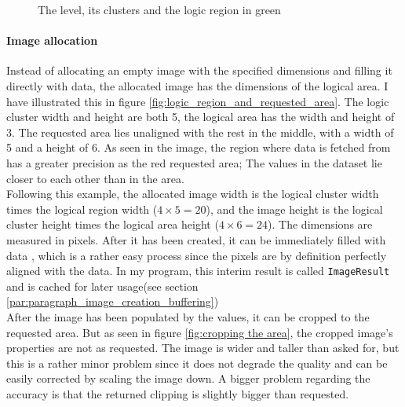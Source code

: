 \documentclass[10pt,a4paper,titlepage]{article}
\begin{document}
	\begin{figure}
		\centering
		\caption{The level, its clusters and the logic region in green}
		\label{fig:logic_region_over_dataset}
	\end{figure}
	\paragraph{Image allocation}
	Instead of allocating an empty image with the specified dimensions and filling it directly with data, the allocated image has the dimensions of the logical area. I have illustrated this in figure \ref{fig:logic_region_and_requested_area}. The logic cluster width and height are both 5, the logical area has the width and height of 3. The requested area lies unaligned with the rest in the middle, with a width of 5 and a height of 6. As seen in the image, the region where data is fetched from has a greater precision as the red requested area; The values in the dataset lie closer to each other than in the area.\\
	Following this example, the allocated image width is the logical cluster width times the logical region width (\(4 \times 5 = 20\)), and the image height is the logical cluster height times the logical area height (\(4 \times 6 = 24\)). The dimensions are measured in pixels. After it has been created, it can be immediately filled with data , which is a rather easy process since the pixels are by definition perfectly aligned with the data. In my program, this interim result is called \verb|ImageResult| and is cached for later usage(see section \ref{par:paragraph_image_creation_buffering}) \\
	After the image has been populated by the values, it can be cropped to the requested area. But as seen in figure \ref{fig:cropping the area}, the cropped image's properties are not as requested. The image is wider and taller than asked for, but this is a rather minor problem since it does not degrade the quality and can be easily corrected by scaling the image down. A bigger problem regarding the accuracy is that the returned clipping is slightly bigger than requested.
	
\end{document}
